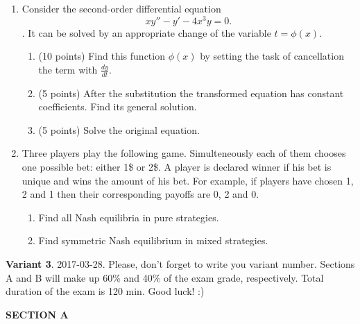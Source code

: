 \documentclass[12pt,a4paper]{article}
\begin{document}
\begin{enumerate}[resume]


\item Consider the second-order differential equation
\[
xy'' - y' - 4{x^3}y = 0.
\].
It can be solved by an appropriate change of the variable $t = \phi (x)$.
\begin{enumerate}
  \item (10 points) Find this function $\phi (x)$ by setting the task of cancellation the term with $\frac{{dy}}{{dt}}$.
  \item (5 points) After the substitution the transformed equation has constant coefficients. Find its general solution.
  \item (5 points) Solve the original equation.
\end{enumerate}

\item Three players play the following game. Simulteneously each of them chooses one possible bet: either 1\$ or 2\$. A player is declared winner if his bet is unique and wins the amount of his bet. For example, if players have chosen 1, 2 and 1 then their corresponding payoffs are 0, 2 and 0.

\begin{enumerate}
  \item Find all Nash equilibria in pure strategies.
  \item Find symmetric Nash equilibrium in mixed strategies.
\end{enumerate}

\end{enumerate}

\newpage
\thispagestyle{empty}
\textbf{Variant 3}. 2017-03-28. Please, don't forget to write you variant number. Sections A and B will make up 60\% and 40\% of the exam grade, respectively. Total duration of the exam is 120 min. Good luck! :)


\textbf{SECTION A}
\end{document}
